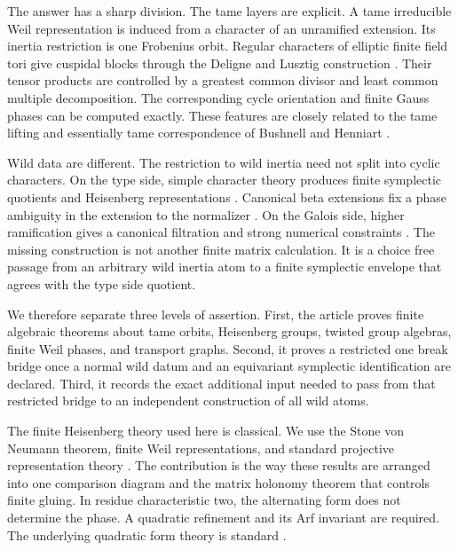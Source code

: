 \documentclass[11pt]{amsart}
\theoremstyle{definition}
\theoremstyle{remark}
\begin{document}
The answer has a sharp division. The tame layers are explicit. A tame irreducible Weil representation is induced from a character of an unramified extension. Its inertia restriction is one Frobenius orbit. Regular characters of elliptic finite field tori give cuspidal blocks through the Deligne and Lusztig construction \cite{DeligneLusztig1976}. Their tensor products are controlled by a greatest common divisor and least common multiple decomposition. The corresponding cycle orientation and finite Gauss phases can be computed exactly. These features are closely related to the tame lifting and essentially tame correspondence of Bushnell and Henniart \cite{BushnellHenniart1996,BushnellHenniart1999,BushnellHenniart2005ET1,BushnellHenniart2005ET2,BushnellHenniart2010ET3}.

Wild data are different. The restriction to wild inertia need not split into cyclic characters. On the type side, simple character theory produces finite symplectic quotients and Heisenberg representations \cite{BushnellKutzko1993}. Canonical beta extensions fix a phase ambiguity in the extension to the normalizer \cite{Blondel2012,Dotto2022}. On the Galois side, higher ramification gives a canonical filtration and strong numerical constraints \cite{BushnellHenniart2017}. The missing construction is not another finite matrix calculation. It is a choice free passage from an arbitrary wild inertia atom to a finite symplectic envelope that agrees with the type side quotient.

We therefore separate three levels of assertion. First, the article proves finite algebraic theorems about tame orbits, Heisenberg groups, twisted group algebras, finite Weil phases, and transport graphs. Second, it proves a restricted one break bridge once a normal wild datum and an equivariant symplectic identification are declared. Third, it records the exact additional input needed to pass from that restricted bridge to an independent construction of all wild atoms.

The finite Heisenberg theory used here is classical. We use the Stone von Neumann theorem, finite Weil representations, and standard projective representation theory \cite{Gerardin1977,Neuhauser2002,Prasad2009,Karpilovsky1985,GurevichHadani2007}. The contribution is the way these results are arranged into one comparison diagram and the matrix holonomy theorem that controls finite gluing. In residue characteristic two, the alternating form does not determine the phase. A quadratic refinement and its Arf invariant are required. The underlying quadratic form theory is standard \cite{MilnorHusemoller1973}.
\end{document}
